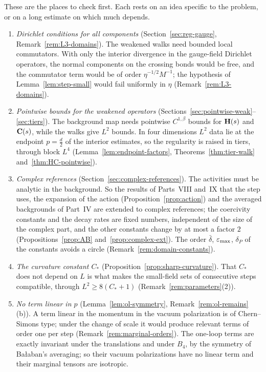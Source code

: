 \label{g:hard}

These are the places to check first. Each rests on an idea specific to the problem, or on a long estimate on which much depends.
\begin{enumerate}[label=(\arabic*)]
\item \emph{Dirichlet conditions for all components} (Section~\ref{sec:reg-gauge}, Remark~\ref{rem:L3-domains}). The weakened walks need bounded local commutators. With only the interior divergence in the gauge-field Dirichlet operators, the normal components on the crossing bonds would be free, and the commutator term would be of order $\eta^{-1/2}M^{-1}$; the hypothesis of Lemma~\ref{lem:step-small} would fail uniformly in $\eta$ (Remark~\ref{rem:L3-domains}).
\item \emph{Pointwise bounds for the weakened operators} (Sections~\ref{sec:pointwise-weak}--\ref{sec:tiers}). The background map needs pointwise $C^{1,\beta}$ bounds for $\mathbf H(s)$ and $\mathbf C(s)$, while the walks give $L^2$ bounds. In four dimensions $L^2$ data lie at the endpoint $p=\frac d2$ of the interior estimates, so the regularity is raised in tiers, through block $L^4$ (Lemma~\ref{lem:endpoint-factors}, Theorems~\ref{thm:tier-walk} and~\ref{thm:HC-pointwise}).
\item \emph{Complex references} (Section~\ref{sec:complex-references}). The activities must be analytic in the background. So the results of Parts~VIII and~IX that the step uses, the expansion of the action (Proposition~\ref{prop:action}) and the averaged backgrounds of Part~IV are extended to complex references; the coercivity constants and the decay rates are fixed numbers, independent of the size of the complex part, and the other constants change by at most a factor $2$ (Propositions~\ref{prop:AB} and~\ref{prop:complex-ext}). The order $\bar\delta$, $\varepsilon_{\max}$, $\delta_P$ of the constants avoids a circle (Remark~\ref{rem:domain-constants}).
\item \emph{The curvature constant $C_*$} (Proposition~\ref{prop:sharp-curvature}). That $C_*$ does not depend on $L$ is what makes the small-field sets of consecutive steps compatible, through $L^2\ge8(C_*+1)$ (Remark~\ref{rem:parameters}(2)).
\item \emph{No term linear in $p$} (Lemma~\ref{lem:ol-symmetry}, Remark~\ref{rem:ol-remains}(b)). A term linear in the momentum in the vacuum polarization is of Chern--Simons type; under the change of scale it would produce relevant terms of order one per step (Remark~\ref{rem:marginal-orders}). The one-loop terms are exactly invariant under the translations and under $B_4$, by the symmetry of Ba\l aban's averaging; so their vacuum polarizations have no linear term and their marginal tensors are isotropic.

\end{enumerate}
